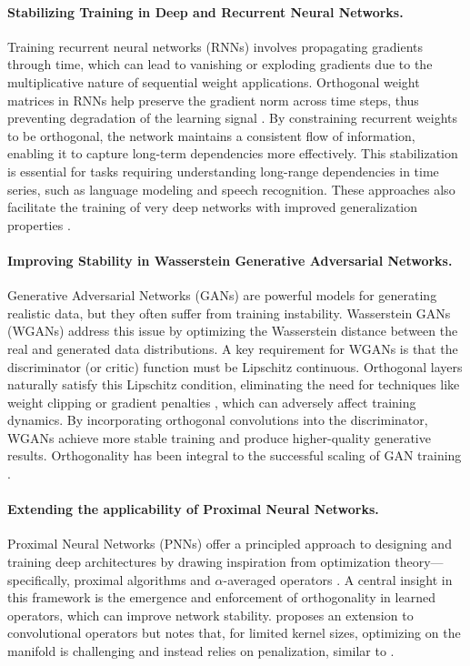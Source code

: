     \paragraph{Stabilizing Training in Deep and Recurrent Neural Networks.}
    Training recurrent neural networks (RNNs) involves propagating gradients through time, which can lead to vanishing or exploding gradients due to the multiplicative nature of sequential weight applications. Orthogonal weight matrices in RNNs help preserve the gradient norm across time steps, thus preventing degradation of the learning signal \cite{kiani_projunn_2022}. By constraining recurrent weights to be orthogonal, the network maintains a consistent flow of information, enabling it to capture long-term dependencies more effectively. This stabilization is essential for tasks requiring understanding long-range dependencies in time series, such as language modeling and speech recognition. These approaches also facilitate the training of very deep networks \cite{qi_deep_isometric_2020} with improved generalization properties \cite{bansal2018gainorthogonalityregularizationstraining}.
    
    \paragraph{Improving Stability in Wasserstein Generative Adversarial Networks.}
    Generative Adversarial Networks (GANs) are powerful models for generating realistic data, but they often suffer from training instability. Wasserstein GANs (WGANs) \cite{arjovsky2017wasserstein} address this issue by optimizing the Wasserstein distance between the real and generated data distributions. A key requirement for WGANs is that the discriminator (or critic) function must be Lipschitz continuous. Orthogonal layers naturally satisfy this Lipschitz condition, eliminating the need for techniques like weight clipping or gradient penalties \cite{gulrajani2017improved}, which can adversely affect training dynamics. By incorporating orthogonal convolutions into the discriminator, WGANs achieve more stable training \cite{miyato2018spectral, muller2019orthogonal} and produce higher-quality generative results. Orthogonality has been integral to the successful scaling of GAN training \cite{brock2018large}. %

    \paragraph{Extending the applicability of Proximal Neural Networks.}
    Proximal Neural Networks (PNNs) offer a principled approach to designing and training deep architectures by drawing inspiration from optimization theory—specifically, proximal algorithms and $\alpha$-averaged operators \cite{hasannasab2020parseval, combettes2020lipschitz}. A central insight in this framework is the emergence and enforcement of orthogonality in learned operators, which can improve network stability. \cite{hertrich2021convolutional} proposes an extension to convolutional operators but notes that, for limited kernel sizes, optimizing on the manifold is challenging and instead relies on penalization, similar to \cite{wang_orthogonal_2020}.

